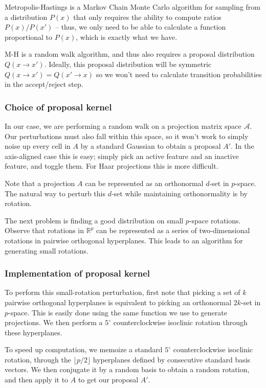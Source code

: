 \documentclass[ejs,preprint]{imsart}
\begin{document}
Metropolis-Hastings \cite{MRRTT53} is a Markov Chain Monte Carlo algorithm for sampling from a distribution $P(x)$ that only requires the ability to compute ratios $P(x)/P(x')$ -- thus, we only need to be able to calculate a function proportional to $P(x)$, which is exactly what we have.

M-H is a random walk algorithm, and thus also requires a proposal distribution $Q(x\to x')$. Ideally, this proposal distribution will be symmetric $Q(x\to x')=Q(x'\to x)$ so we won't need to calculate transition probabilities in the accept/reject step.

\subsubsection{Choice of proposal kernel}

In our case, we are performing a random walk on a projection matrix space $\mathcal A$. Our perturbations must also fall within this space, so it won't work to simply noise up every cell in $A$ by a standard Gaussian to obtain a proposal $A'$. In the axis-aligned case this is easy; simply pick an active feature and an inactive feature, and toggle them. For Haar projections this is more difficult.

Note that a projection $A$ can be represented as an orthonormal $d$-set in $p$-space. The natural way to perturb this $d$-set while maintaining orthonormality is by rotation.

The next problem is finding a good distribution on small $p$-space rotations. Observe that rotations in $\mathbb R^p$ can be represented as a series of two-dimensional rotations in pairwise orthogonal hyperplanes. This leads to an algorithm for generating small rotations.

\subsubsection{Implementation of proposal kernel}

To perform this small-rotation perturbation, first note that picking a set of $k$ pairwise orthogonal hyperplanes is equivalent to picking an orthonormal $2k$-set in $p$-space. This is easily done using the same function we use to generate projections. We then perform a $5^\circ$ counterclockwise isoclinic rotation through these hyperplanes.

To speed up computation, we memoize a standard $5^\circ$ counterclockwise isoclinic rotation, through the $\lfloor p/2 \rfloor$ hyperplanes defined by consecutive standard basis vectors. We then conjugate it by a random basis to obtain a random rotation, and then apply it to $A$ to get our proposal $A'$.
\end{document}
